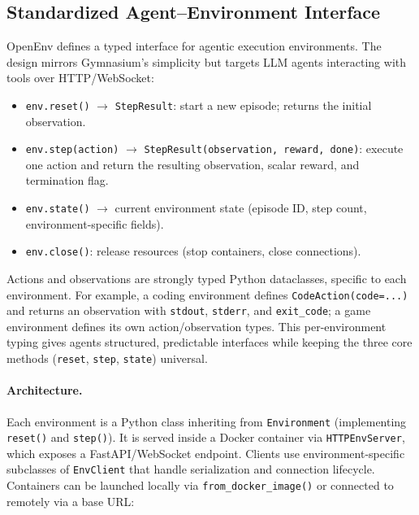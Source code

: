 \subsection{Standardized Agent--Environment Interface}
\label{standardized-agentenvironment-interface}

OpenEnv defines a typed interface for agentic execution environments. The design mirrors Gymnasium’s simplicity but targets LLM agents interacting with tools over HTTP/WebSocket:

\begin{itemize}
  \item \texttt{env.reset()} $\to$ \texttt{StepResult}: start a new episode; returns the initial observation.
  \item \texttt{env.step(action)} $\to$ \texttt{StepResult(observation, reward, done)}: execute one action and return the resulting observation, scalar reward, and termination flag.
  \item \texttt{env.state()} $\to$ current environment state (episode ID, step count, environment-specific fields).
  \item \texttt{env.close()}: release resources (stop containers, close connections).
\end{itemize}

Actions and observations are strongly typed Python dataclasses, specific to each environment. For example, a coding environment defines \texttt{CodeAction(code=...)} and returns an observation with \texttt{stdout}, \texttt{stderr}, and \texttt{exit\_code}; a game environment defines its own action/observation types. This per-environment typing gives agents structured, predictable interfaces while keeping the three core methods (\texttt{reset}, \texttt{step}, \texttt{state}) universal.

\paragraph{Architecture.}
\label{architecture.}

Each environment is a Python class inheriting from \texttt{Environment} (implementing \texttt{reset()} and \texttt{step()}). It is served inside a Docker container via \texttt{HTTPEnvServer}, which exposes a FastAPI/WebSocket endpoint. Clients use environment-specific subclasses of \texttt{EnvClient} that handle serialization and connection lifecycle. Containers can be launched locally via \texttt{from\_docker\_image()} or connected to remotely via a base URL:

